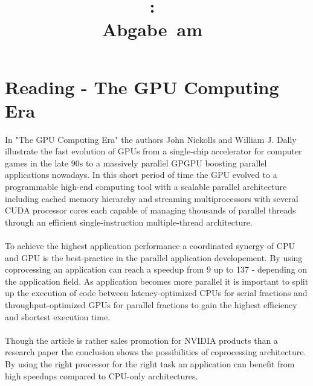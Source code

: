 \documentclass{article}
\title{
\vspace{2in}
\textmd{\textbf{\hmwkClass:\ \hmwkTitle}}\\
\normalsize\vspace{0.1in}\small{Abgabe\ am\ \hmwkDueDate}\\
\vspace{0.1in}\large{\textit{\hmwkClassTime}}
\vspace{3in}
}
\author{\textbf{\hmwkAuthorName}}
\date{} %
\newcommand{\enterProblemHeader}[1]{
}
\newcommand{\exitProblemHeader}[1]{
}
\newcounter{homeworkProblemCounter} %
\newcommand{\homeworkProblemName}{}
\newenvironment{homeworkProblem}[1][Problem \arabic{homeworkProblemCounter}]{ %
\stepcounter{homeworkProblemCounter} %
\renewcommand{\homeworkProblemName}{#1} %
\section{\homeworkProblemName} %
}{
}
\begin{document}
\maketitle


\newpage
\tableofcontents
\newpage


\begin{homeworkProblem}[Reading - The GPU Computing Era]
In "The GPU Computing Era" the authors John Nickolls and William J. Dally illustrate the fast evolution of GPUs from a single-chip accelerator for computer games in the late 90s to a massively parallel GPGPU boosting parallel applications nowadays. In this short period of time the GPU evolved to a programmable high-end computing tool with a scalable parallel architecture including cached memory hierarchy and streaming multiprocessors with several CUDA processor cores each capable of managing thousands of parallel threads through an efficient single-instruction multiple-thread architecture. \\ \\
To achieve the highest application performance a coordinated synergy of CPU and GPU is the best-practice in the parallel application developement. By using coprocessing an application can reach a speedup from 9 up to 137 - depending on the application field. As application becomes more parallel it is important to split up the execution of code between latency-optimized CPUs for serial fractions and throughput-optimized GPUs for parallel fractions to gain the highest efficiency and shortest execution time. \\ \\
Though the article is rather sales promotion for NVIDIA products than a research paper the conclusion shows the possibilities of coprocessing architecture. By using the right processor for the right task an application can benefit from high speedups compared to CPU-only architectures.    
\end{homeworkProblem}
\end{document}
